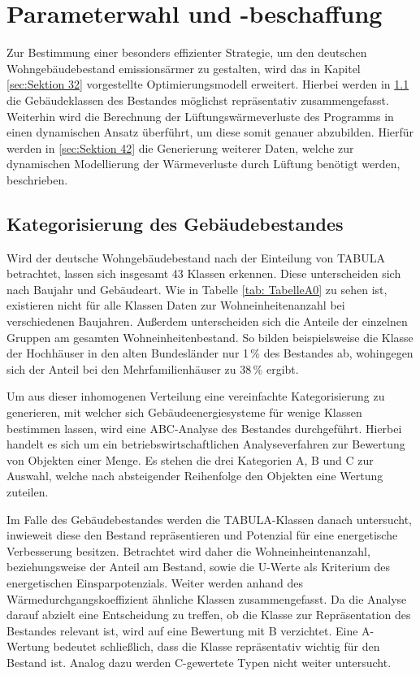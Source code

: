 \chapter{Parameterwahl und -beschaffung}

Zur Bestimmung einer besonders effizienter Strategie, um den deutschen Wohngebäudebestand emissionsärmer zu gestalten, wird das in Kapitel \ref{sec:Sektion 32} vorgestellte Optimierungsmodell erweitert.
Hierbei werden in \ref{sec:Sektion 41} die Gebäudeklassen des Bestandes möglichst repräsentativ zusammengefasst.
Weiterhin wird die Berechnung der Lüftungswärmeverluste des Programms in einen dynamischen Ansatz überführt, um diese somit genauer abzubilden.
Hierfür werden in \ref{sec:Sektion 42} die Generierung weiterer Daten, welche zur dynamischen Modellierung der Wärmeverluste durch Lüftung benötigt werden, beschrieben.

\section{Kategorisierung des Gebäudebestandes}
\label{sec:Sektion 41}

Wird der deutsche Wohngebäudebestand nach der Einteilung von TABULA betrachtet, lassen sich insgesamt 43 Klassen erkennen.
Diese unterscheiden sich nach Baujahr und Gebäudeart.
Wie in Tabelle \ref{tab: TabelleA0} zu sehen ist, existieren nicht für alle Klassen Daten zur Wohneinheitenanzahl bei verschiedenen Baujahren.
Außerdem unterscheiden sich die Anteile der einzelnen Gruppen am gesamten Wohneinheitenbestand.
So bilden beispielsweise die Klasse der Hochhäuser in den alten Bundesländer nur 1\,\% des Bestandes ab, wohingegen sich der Anteil bei den Mehrfamilienhäuser zu 38\,\% ergibt.

Um aus dieser inhomogenen Verteilung eine vereinfachte Kategorisierung zu generieren, mit welcher sich Gebäudeenergiesysteme für wenige Klassen bestimmen lassen, wird eine ABC-Analyse des Bestandes durchgeführt.
Hierbei handelt es sich um ein betriebswirtschaftlichen Analyseverfahren zur Bewertung von Objekten einer Menge.
Es stehen die drei Kategorien A, B und C zur Auswahl, welche nach absteigender Reihenfolge den Objekten eine Wertung zuteilen.

Im Falle des Gebäudebestandes werden die TABULA-Klassen danach untersucht, inwieweit diese den Bestand repräsentieren und Potenzial für eine energetische Verbesserung besitzen.
Betrachtet wird daher die Wohneinheintenanzahl, beziehungsweise der Anteil am Bestand, sowie die U-Werte als Kriterium des energetischen Einsparpotenzials.
Weiter werden anhand des Wärmedurchgangskoeffizient ähnliche Klassen zusammengefasst.
Da die Analyse darauf abzielt eine Entscheidung zu treffen, ob die Klasse zur Repräsentation des Bestandes relevant ist, wird auf eine Bewertung mit B verzichtet.
Eine A-Wertung bedeutet schließlich, dass die Klasse repräsentativ wichtig für den Bestand ist.
Analog dazu werden C-gewertete Typen nicht weiter untersucht.

